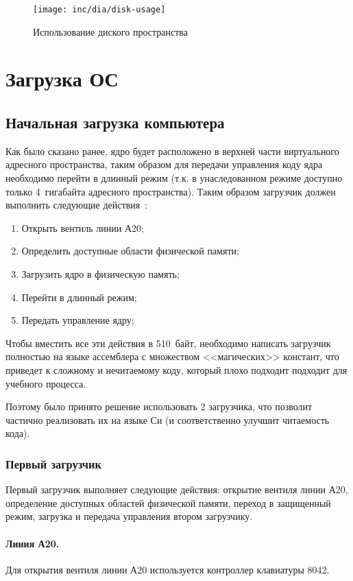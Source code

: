 \begin{figure}[ht!]
  \centering
  \texttt{[image: inc/dia/disk-usage]}
  \caption{Использование диского пространства}
  \label{fig:disk-usage}
\end{figure}


\section{Загрузка ОС}

\subsection{Начальная загрузка компьютера}
Как было сказано ранее, ядро будет расположено в верхней части
виртуального адресного пространства, таким образом для передачи управления коду
ядра необходимо перейти в длинный режим (т.к. в унаследованном режиме доступно
только 4~гигабайта адресного пространства). Таким образом загрузчик должен
выполнить следующие действия~\cite{mstu_os_dev_method}:
\begin{enumerate}[1.]
\item Открыть вентиль линии А20;
\item Определить доступные области физической памяти;
\item Загрузить ядро в физическую память;
\item Перейти в длинный режим;
\item Передать управление ядру;
\end{enumerate}

Чтобы вместить все эти действия в 510~байт, необходимо написать загрузчик полностью
на языке ассемблера с множеством <<магических>> констант, что приведет к сложному и
нечитаемому коду, который плохо подходит подходит для учебного процесса.

Поэтому было принято решение использовать 2 загрузчика, что позволит частично реализовать
их на языке Си (и соответственно улучшит читаемость кода).

\subsubsection*{Первый загрузчик}
Первый загрузчик выполняет следующие действия: открытие вентиля линии А20, определение доступных
областей физической памяти, переход в защищенный режим, загрузка и передача управления
втором загрузчику.

\paragraph{Линия А20.} Для открытия вентиля линии А20 используется контроллер клавиатуры 8042.


